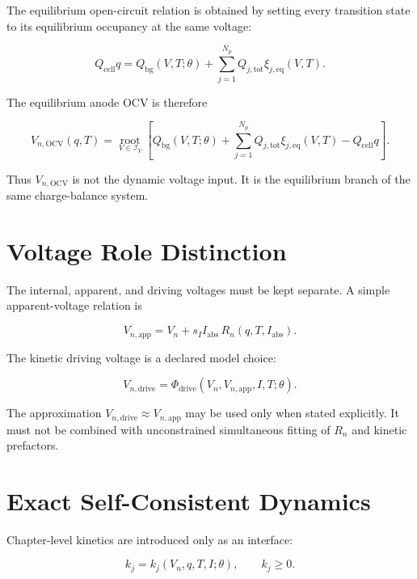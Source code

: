 \documentclass[11pt,a4paper]{article}
\newcommand{\cell}{\mathrm{cell}}
\newcommand{\bg}{\mathrm{bg}}
\newcommand{\tot}{\mathrm{tot}}
\newcommand{\eq}{\mathrm{eq}}
\newcommand{\app}{\mathrm{app}}
\newcommand{\drive}{\mathrm{drive}}
\newcommand{\OCV}{\mathrm{OCV}}
\newcommand{\absI}{I_{\mathrm{abs}}}
\begin{document}
The equilibrium open-circuit relation is obtained by setting every transition state to its equilibrium occupancy at the same voltage:

\begin{equation}
Q_{\cell}q
=
Q_{\bg}(V,T;\theta)
+
\sum_{j=1}^{N_p}Q_{j,\tot}\xi_{j,\eq}(V,T).
\label{eq:ocv_balance}
\end{equation}

The equilibrium anode OCV is therefore

\begin{equation}
V_{n,\OCV}(q,T)=
\operatorname*{root}_{V\in\mathcal{I}_V}
\left[
Q_{\bg}(V,T;\theta)
+
\sum_{j=1}^{N_p}Q_{j,\tot}\xi_{j,\eq}(V,T)
-
Q_{\cell}q
\right].
\label{eq:ocv_root}
\end{equation}

Thus \(V_{n,\OCV}\) is not the dynamic voltage input. It is the equilibrium branch of the same charge-balance system.

\section{Voltage Role Distinction}

The internal, apparent, and driving voltages must be kept separate. A simple apparent-voltage relation is

\begin{equation}
V_{n,\app}
=
V_n+s_I\absI\,R_n(q,T,\absI).
\label{eq:apparent_voltage}
\end{equation}

The kinetic driving voltage is a declared model choice:

\begin{equation}
V_{n,\drive}
=
\Phi_{\drive}(V_n,V_{n,\app},I,T;\theta).
\label{eq:driving_voltage}
\end{equation}

The approximation \(V_{n,\drive}\approx V_{n,\app}\) may be used only when stated explicitly. It must not be combined with unconstrained simultaneous fitting of \(R_n\) and kinetic prefactors.

\section{Exact Self-Consistent Dynamics}

Chapter-level kinetics are introduced only as an interface:

\begin{equation}
k_j=k_j(V_n,q,T,I;\theta),
\qquad
k_j\ge 0.
\label{eq:rate_interface}
\end{equation}
\end{document}
